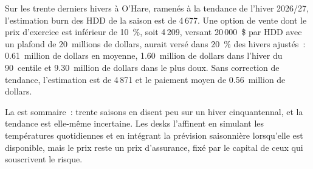 \begin{example}\label{ex:m3:freight-weather-and-other-corners:put}
Sur les trente derniers hivers à O'Hare, ramenés à la tendance de l'hiver 2026/27, l'estimation burn des
HDD de la saison est de 4\,677. Une option de vente dont le prix d'exercice est inférieur de 10~\%, soit 4\,209, versant 20\,000~\$ par HDD avec un
plafond de 20~millions de dollars, aurait versé dans 20~\% des hivers ajustés~: 0.61~million de dollars en moyenne,
1.60~million de dollars dans l'hiver du 90~centile et 9.30~million de dollars dans le plus doux. Sans correction de tendance,
l'estimation est de 4\,871 et le paiement moyen de 0.56~million de dollars.
\end{example}

\begin{omfigure}

\label{fig:m3:freight-weather-and-other-corners:burn}
\end{omfigure}

La  est sommaire~: trente saisons en disent peu sur un hiver cinquantennal, et la tendance est elle-même
incertaine. Les desks l'affinent en simulant les températures quotidiennes et en intégrant la prévision saisonnière
lorsqu'elle est disponible, mais le prix reste un prix d'assurance, fixé par le capital de ceux qui
souscrivent le risque.

